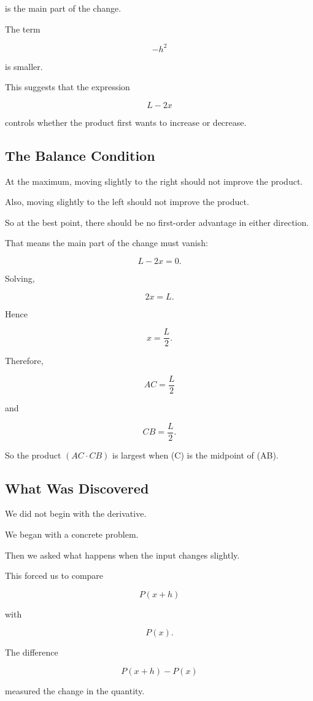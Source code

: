 is the main part of the change.

The term

\[
-h^2
\]

is smaller.

This suggests that the expression

\[
L-2x
\]

controls whether the product first wants to increase or decrease.

\subsection{The Balance Condition}

At the maximum, moving slightly to the right should not improve the product.

Also, moving slightly to the left should not improve the product.

So at the best point, there should be no first-order advantage in either direction.

That means the main part of the change must vanish:

\[
L-2x=0.
\]

Solving,

\[
2x=L.
\]

Hence

\[
x=\frac L2.
\]

Therefore,

\[
AC=\frac L2
\]

and

\[
CB=\frac L2.
\]

So the product $(AC\cdot CB)$ is largest when (C) is the midpoint of (AB).

\subsection{What Was Discovered}

We did not begin with the derivative.

We began with a concrete problem.

Then we asked what happens when the input changes slightly.

This forced us to compare

\[
P(x+h)
\]

with

\[
P(x).
\]

The difference

\[
P(x+h)-P(x)
\]

measured the change in the quantity.

